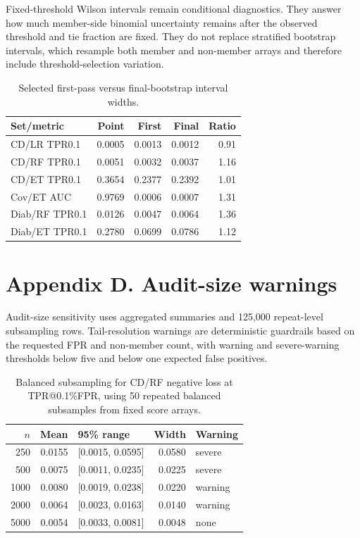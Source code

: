 \documentclass[
  10pt,
  twocolumn]{article}
\begin{document}
Fixed-threshold Wilson intervals remain conditional diagnostics. They answer how much member-side binomial uncertainty remains after the observed threshold and tie fraction are fixed. They do not replace stratified bootstrap intervals, which resample both member and non-member arrays and therefore include threshold-selection variation.

\begin{table}[H]
\centering
\scriptsize
\caption{Selected first-pass versus final-bootstrap interval widths.}
\label{tab:appendix-final-bootstrap-examples}
\setlength{\tabcolsep}{3pt}
\begin{tabular}{@{}l r r r r@{}}
\toprule
Set/metric & Point & First & Final & Ratio \\
\midrule
CD/LR TPR0.1 & 0.0005 & 0.0013 & 0.0012 & 0.91 \\
CD/RF TPR0.1 & 0.0051 & 0.0032 & 0.0037 & 1.16 \\
CD/ET TPR0.1 & 0.3654 & 0.2377 & 0.2392 & 1.01 \\
Cov/ET AUC & 0.9769 & 0.0006 & 0.0007 & 1.31 \\
Diab/RF TPR0.1 & 0.0126 & 0.0047 & 0.0064 & 1.36 \\
Diab/ET TPR0.1 & 0.2780 & 0.0699 & 0.0786 & 1.12 \\
\bottomrule
\end{tabular}
\end{table}

\hypertarget{appendix-d-audit-size-sensitivity-and-tail-resolution-warnings}{%
\section{Appendix D. Audit-size warnings}\label{appendix-d-audit-size-sensitivity-and-tail-resolution-warnings}}

Audit-size sensitivity uses aggregated summaries and 125,000 repeat-level subsampling rows. Tail-resolution warnings are deterministic guardrails based on the requested FPR and non-member count, with warning and severe-warning thresholds below five and below one expected false positives.

\begin{table}[H]
\centering
\scriptsize
\caption{Balanced subsampling for CD/RF negative loss at TPR@0.1\%FPR, using 50 repeated balanced subsamples from fixed score arrays.}
\label{tab:appendix-sample-size-example}
\begin{tabularx}{\columnwidth}{r r l r l}
\toprule
$n$ & Mean & 95\% range & Width & Warning \\
\midrule
250 & 0.0155 & [0.0015, 0.0595] & 0.0580 & severe \\
500 & 0.0075 & [0.0011, 0.0235] & 0.0225 & severe \\
1000 & 0.0080 & [0.0019, 0.0238] & 0.0220 & warning \\
2000 & 0.0064 & [0.0023, 0.0163] & 0.0140 & warning \\
5000 & 0.0054 & [0.0033, 0.0081] & 0.0048 & none \\
\bottomrule
\end{tabularx}
\end{table}
\end{document}
